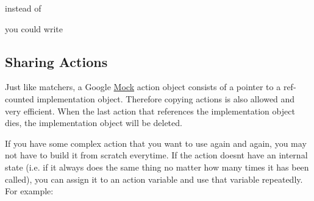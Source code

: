 instead of


\begin{DoxyCode}{0}
\DoxyCodeLine{}
\DoxyCodeLine{\}}
\DoxyCodeLine{}
\DoxyCodeLine{\}}
\DoxyCodeLine{}
\end{DoxyCode}


you could write


\begin{DoxyCode}{0}
\DoxyCodeLine{}
\DoxyCodeLine{\}}
\DoxyCodeLine{}
\end{DoxyCode}


\subsection*{Sharing Actions}

Just like matchers, a Google \mbox{\hyperlink{class_mock}{Mock}} action object consists of a pointer to a ref-\/counted implementation object. Therefore copying actions is also allowed and very efficient. When the last action that references the implementation object dies, the implementation object will be deleted.

If you have some complex action that you want to use again and again, you may not have to build it from scratch everytime. If the action doesn\textquotesingle{}t have an internal state (i.\+e. if it always does the same thing no matter how many times it has been called), you can assign it to an action variable and use that variable repeatedly. For example\+:


